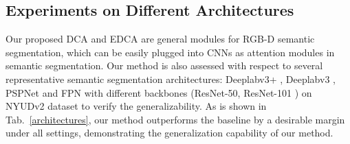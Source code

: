 \documentclass[10pt,twocolumn,letterpaper]{article}
\begin{document}
\subsection{Experiments on Different Architectures}
Our proposed DCA and EDCA are general modules for RGB-D semantic segmentation, which can be easily plugged into CNNs
as attention modules in semantic segmentation. Our method is also assessed with respect to several
representative semantic segmentation architectures: Deeplabv3+ \cite{chen2018encoder}, Deeplabv3 \cite{chen2017rethinking},
PSPNet \cite{lin2017feature} and FPN \cite{zhao2017pyramid} with different backbones (ResNet-50, ResNet-101 \cite{he2016deep})
on NYUDv2 dataset to verify the generalizability. As is shown in Tab.~\ref{architectures}, our method outperforms the baseline
by a desirable margin under all settings, demonstrating the generalization capability of our method.


\begin{table}
   \centering
   \caption{Performance comparison with the state-of-the-art methods on NYUDv2 test set. `*' means multi-scale testing.}
   \label{nyuv2}
\end{table}
\end{document}
